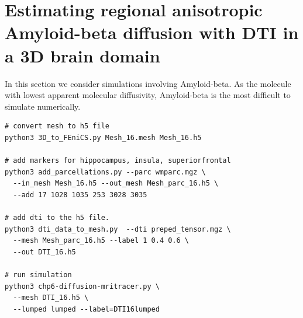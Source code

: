 \section[Estimating regional anisotropic Amyloid-beta diffusion ]{Estimating regional anisotropic Amyloid-beta diffusion with DTI in a 3D brain domain}\label{sec:chp6:3D}
In this section we consider simulations involving Amyloid-beta.  As the molecule 
with lowest apparent molecular diffusivity, Amyloid-beta is the most difficult 
to simulate numerically.  
\begin{lstlisting}[style=bashStyle]
# convert mesh to h5 file 
python3 3D_to_FEniCS.py Mesh_16.mesh Mesh_16.h5

# add markers for hippocampus, insula, superiorfrontal 
python3 add_parcellations.py --parc wmparc.mgz \ 
  --in_mesh Mesh_16.h5 --out_mesh Mesh_parc_16.h5 \ 
  --add 17 1028 1035 253 3028 3035    

# add dti to the h5 file. 
python3 dti_data_to_mesh.py  --dti preped_tensor.mgz \
  --mesh Mesh_parc_16.h5 --label 1 0.4 0.6 \ 
  --out DTI_16.h5 

# run simulation  
python3 chp6-diffusion-mritracer.py \ 
  --mesh DTI_16.h5 \ 
  --lumped lumped --label=DTI16lumped 
\end{lstlisting}

